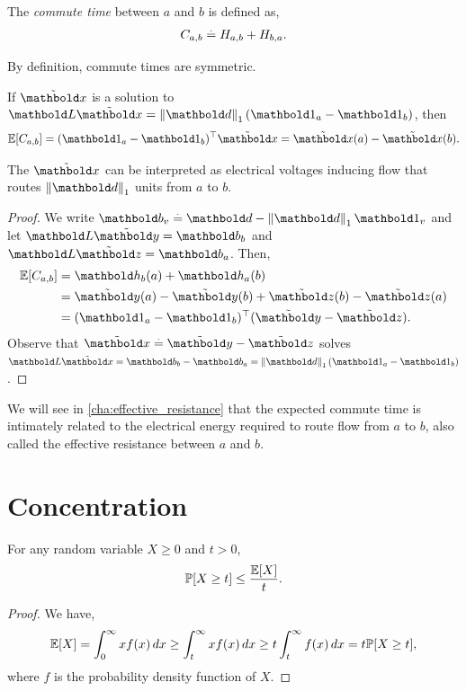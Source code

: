 \begin{defn} The \emph{commute time} between $a$ and $b$ is defined as, \begin{align}
    C_{a,b} \overset{.}{=} H_{a,b} + H_{b,a}.
\end{align}
\end{defn}
\begin{rmk}
By definition, commute times are symmetric.
\end{rmk}

\begin{lem}
If $\elx$ is a solution to $\mL\elx = \norm{\vd}_1 (\vOne_a - \vOne_b)$, then \begin{align}
    \E{C_{a,b}} = \trans{(\vOne_a - \vOne_b)}\elx = \elx(a) - \elx(b).
\end{align}
\end{lem} The $\elx$ can be interpreted as electrical voltages inducing flow that routes $\norm{\vd}_1$ units from $a$ to $b$.
\begin{proof}
We write $\vb_v \defeq \vd - \norm{\vd}_1 \vOne_v$ and let $\mL\ey = \vb_b$ and $\mL\ez = \vb_a$. Then, \begin{align*}
    \E{C_{a,b}} &= \vh_b(a) + \vh_a(b) \\
    &= \ey(a) - \ey(b) + \ez(b) - \ez(a) \\
    &= \trans{(\vOne_a - \vOne_b)}(\ey - \ez).
\end{align*} Observe that $\elx \defeq \ey - \ez$ solves $\mL\elx = \vb_b - \vb_a = \norm{\vd}_1 (\vOne_a - \vOne_b)$.
\end{proof}

We will see in \cref{cha:effective_resistance} that the expected commute time is intimately related to the electrical energy required to route flow from $a$ to $b$, also called the effective resistance between $a$ and $b$.

\section{Concentration}

\begin{thm}
For any random variable $X \geq 0$ and $t > 0$, \begin{align}
    \Pr{X \geq t} \leq \frac{\E{X}}{t}.
\end{align}
\end{thm}
\begin{proof} We have, \begin{align*}
    \E{X} = \int_0^\infty x f(x) \,dx \geq \int_t^\infty x f(x) \, dx \geq t \int_t^\infty f(x) \,dx = t \Pr{X \geq t},
\end{align*} where $f$ is the probability density function of $X$.
\end{proof}

